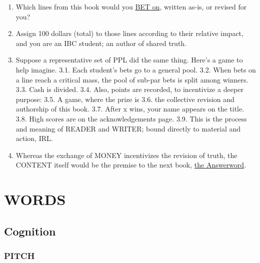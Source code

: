 \documentclass[
]{book}
\begin{document}
\begin{enumerate}
\def\labelenumi{\arabic{enumi}.}
\item
  Which lines from this book would you \protect\hyperlink{how-to-read}{BET on}, written as-is, or revised for you?
\item
  Assign 100 dollars (total) to those lines according to their relative impact, and you are an IBC student; an author of shared truth.
\item
  Suppose a representative set of PPL did the same thing. Here's a game to help imagine.
  3.1. Each student's bets go to a general pool.
  3.2. When bets on a line reach a critical mass, the pool of sub-par bets is split among winners.
  3.3. Cash is divided.
  3.4. Also, points are recorded, to incentivize a deeper purpose:
  3.5. A game, where the prize is
  3.6. the collective revision and authorship of this book.
  3.7. After x wins, your name appears on the title.
  3.8. High scores are on the acknowledgements page.
  3.9. This is the process and meaning of READER and WRITER; bound directly to material and action, IRL.
\item
  Whereas the exchange of MONEY incentivizes the revision of truth, the CONTENT itself would be the premise to the next book, \protect\hyperlink{the-answerword}{the Answerword}.
\end{enumerate}

\hypertarget{words}{%
\chapter{WORDS}\label{words}}

\hypertarget{cognition}{%
\section{Cognition}\label{cognition}}

\hypertarget{pitch}{%
\subsection{PITCH}\label{pitch}}
\end{document}
